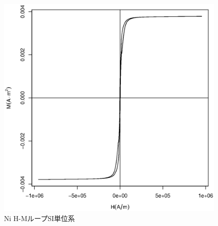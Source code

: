 \documentclass[12pt]{jarticle}
\begin{document}
  \begin{figure}[htb]
    \begin{center}
      \includegraphics[width=125mm]{MagCharNi_SI.eps}
    \end{center}
    \caption{Ni H-MループSI単位系}
    \label{fig:Ni_SI}
  \end{figure}
\end{document}
